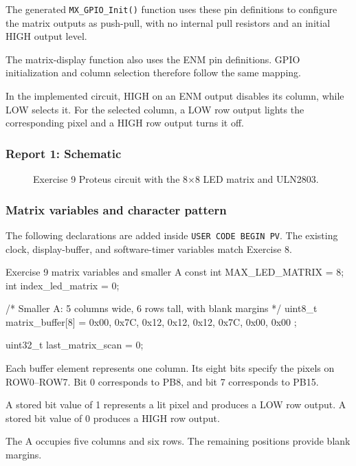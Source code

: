 \documentclass[a4paper]{article}
\begin{document}
The generated \texttt{MX\_GPIO\_Init()} function
uses these pin definitions to configure
the matrix outputs as push-pull, with
no internal pull resistors and an initial
HIGH output level.

The matrix-display function also uses
the ENM pin definitions. GPIO initialization
and column selection therefore follow
the same mapping.

In the implemented circuit, HIGH on an
ENM output disables its column, while LOW
selects it. For the selected column,
a LOW row output lights the corresponding
pixel and a HIGH row output turns it off.

\subsubsection{Report 1: Schematic}

\begin{figure}[H]
    \centering
    \caption{Exercise 9 Proteus circuit with the
    8$\times$8 LED matrix and ULN2803.}
    \label{fig:ex09}
\end{figure}

\subsubsection{Matrix variables and character pattern}

The following declarations are added inside
\texttt{USER CODE BEGIN PV}.
The existing clock, display-buffer, and
software-timer variables match Exercise 8.

\begin{stmcode}{Exercise 9 matrix variables and smaller A}
const int MAX_LED_MATRIX = 8;
int index_led_matrix = 0;

/* Smaller A: 5 columns wide, 6 rows tall, with blank margins */
uint8_t matrix_buffer[8] = {
    0x00, 0x7C, 0x12, 0x12,
    0x12, 0x7C, 0x00, 0x00
};

uint32_t last_matrix_scan = 0;
\end{stmcode}

Each buffer element represents one column.
Its eight bits specify the pixels on
ROW0--ROW7. Bit 0 corresponds to PB8,
and bit 7 corresponds to PB15.

A stored bit value of 1 represents a lit
pixel and produces a LOW row output.
A stored bit value of 0 produces a HIGH
row output.

The A occupies five columns and six rows.
The remaining positions provide blank margins.
\end{document}
